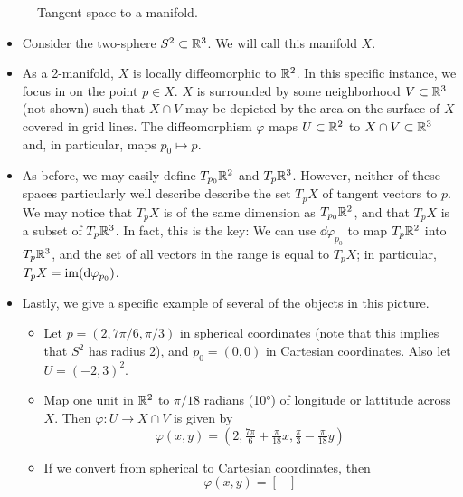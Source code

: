 \documentclass[../notes.tex]{subfiles}
\begin{document}
\begin{itemize}
\begin{figure}[h!]
\begin{tikzpicture}[
            every node/.style={black}
        ]
        \end{tikzpicture}
        \caption{Tangent space to a manifold.}
        \label{fig:TpX}
    \end{figure}
    \begin{itemize}
        \item Consider the two-sphere $S^2\subset\R^3$. We will call this manifold $X$.
        \item As a 2-manifold, $X$ is locally diffeomorphic to $\R^2$. In this specific instance, we focus in on the point $p\in X$. $X$ is surrounded by some neighborhood $V\subset\R^3$ (not shown) such that $X\cap V$ may be depicted by the area on the surface of $X$ covered in grid lines. The diffeomorphism $\varphi$ maps $U\subset\R^2$ to $X\cap V\subset\R^3$ and, in particular, maps $p_0\mapsto p$.
        \item As before, we may easily define $T_{p_0}\R^2$ and $T_p\R^3$. However, neither of these spaces particularly well describe describe the set $T_pX$ of tangent vectors to $p$. We may notice that $T_pX$ is of the same dimension as $T_{p_0}\R^2$, and that $T_pX$ is a subset of $T_p\R^3$. In fact, this is the key: We can use $\dd\varphi_{p_0}$ to map $T_p\R^2$ into $T_p\R^3$, and the set of all vectors in the range is equal to $T_pX$; in particular, $T_pX=\im(\dd\varphi_{p_0})$.
        \item Lastly, we give a specific example of several of the objects in this picture.
        \begin{itemize}
            \item Let $p=(2,7\pi/6,\pi/3)$ in spherical coordinates (note that this implies that $S^2$ has radius 2), and $p_0=(0,0)$ in Cartesian coordinates. Also let $U=(-2,3)^2$.
            \item Map one unit in $\R^2$ to $\pi/18$ radians (\ang{10}) of longitude or lattitude across $X$. Then $\varphi:U\to X\cap V$ is given by
            \begin{equation*}
                \varphi(x,y) = \left( 2,\tfrac{7\pi}{6}+\tfrac{\pi}{18}x,\tfrac{\pi}{3}-\tfrac{\pi}{18}y \right)
            \end{equation*}
            \item If we convert from spherical to Cartesian coordinates, then
            \begin{equation*}
                \varphi(x,y) =
                \begin{bmatrix}

\end{bmatrix}
\end{equation*}
\end{itemize}
\end{itemize}
\end{itemize}
\end{document}
